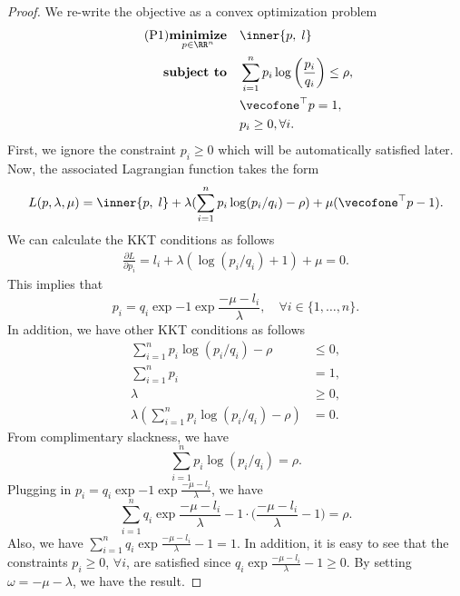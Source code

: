 \begin{proof}
    We re-write the objective as a convex optimization problem
    \begin{align}
        \tag{P1}\underset{p\in\RR^n}{\textbf{minimize}} \quad& \inner{p, \;l} \nonumber \\
        \textbf{subject to} \quad &\sum_{i=1}^n p_i\log\bigg( \frac{p_i}{q_i}\bigg) \leq \rho, \nonumber\\
        & \vecofone^{\top}p=1, \nonumber\\
        & p_i\geq 0, \forall i.\nonumber
    \end{align}
    First, we ignore the constraint $p_i\geq 0$ which will be automatically satisfied later. Now, the associated Lagrangian function takes the form
    \begin{equation*}
        L(p,\lambda,\mu) = \inner{p,\; l} + \lambda (\sum_{i=1}^n p_i\log(p_i/q_i)-\rho) + \mu(\vecofone^{\top} p -1).
    \end{equation*}
    We can calculate the KKT conditions as follows
    \begin{align*}
        \frac{\partial L}{\partial p_i} = l_i + \lambda(\log(p_i/q_i)+ 1) + \mu = 0.
    \end{align*}
    This implies that
    \begin{equation*}
        p_i = q_i \exp{-1}\exp{\frac{-\mu-l_i}{\lambda}}, \quad \forall i\in\{ 1,\dots, n\}.
    \end{equation*}
    In addition, we have other KKT conditions as follows
    \begin{align*}
        \sum_{i=1}^n p_i \log(p_i/q_i) - \rho &\leq 0 ,\\
        \sum_{i=1}^n p_i &= 1 ,\\
        \lambda &\geq 0, \\
        \lambda ( \sum_{i=1}^n p_i \log(p_i/q_i) -\rho) &= 0.
    \end{align*}
    From complimentary slackness, we have
    \begin{equation*}
        \sum_{i=1}^n p_i \log(p_i/q_i) = \rho.
    \end{equation*}
    Plugging in $p_i=q_i \exp{-1}\exp{\frac{-\mu-l_i}{\lambda}}$, we have
    \begin{equation*}
        \sum_{i=1}^n q_i \exp{\frac{-\mu-l_i}{\lambda}-1} \cdot \bigg( \frac{-\mu-l_i}{\lambda}-1\bigg) = \rho.
    \end{equation*}
    Also, we have $\sum_{i=1}^n q_i\exp{\frac{-\mu-l_i}{\lambda} - 1} = 1$. In addition, it is easy to see that the constraints $p_i\geq 0$, $\forall i$, are satisfied since $q_i\exp{\frac{-\mu-l_i}{\lambda}-1}\geq 0$. By setting $\omega=-\mu-\lambda$, we have the result.
\end{proof}
